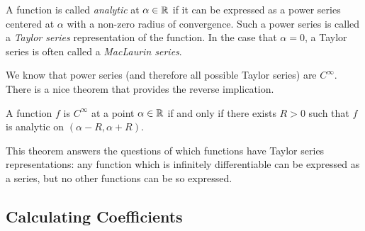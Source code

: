 \documentclass[fleqn,letterpaper]{report}
\begin{document}
\begin{defn}
A function is called \emph{analytic} at $\alpha \in \mathbb{R}$ if it can
be expressed as a power series centered at $\alpha$ with a
non-zero radius of convergence. Such a power series is called
a \emph{Taylor series} representation of the function. In the
case that $\alpha = 0$, a Taylor series is often called a
\emph{MacLaurin series}.
\end{defn}

We know that power series (and therefore all possible Taylor
series) are $C^\infty$. There is a nice theorem that provides
the reverse implication.

\begin{thm}
A function $f$ is $C^\infty$ at a point $\alpha
\in \mathbb{R}$ if and only if there exists $R>0$ such that $f$ is
analytic on $(\alpha-R,\alpha+R)$. 
\end{thm}

This theorem answers the questions of which functions have
Taylor series representations: any function which is
infinitely differentiable can be expressed as a series, but
no other functions can be so expressed.

\subsection{Calculating Coefficients}
\label{calculating-coefficients}
\end{document}
